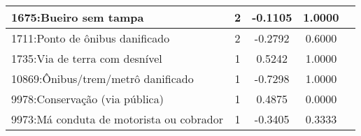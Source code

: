 \begin{table}[htbp]
\begin{tabular}{|l|c|c|c|c|}
		\hline
		1675:Bueiro sem tampa                             & 2                & -0.1105        & 1.0000           \\
		\hline
		1711:Ponto de ônibus danificado                   & 2                & -0.2792        & 0.6000           \\
		\hline
		1735:Via de terra com desnível                    & 1                & 0.5242         & 1.0000           \\
		\hline
		10869:Ônibus/trem/metrô danificado                & 1                & -0.7298        & 1.0000           \\
		\hline
		9978:Conservação (via pública)                    & 1                & 0.4875         & 0.0000           \\
		\hline
		9973:Má conduta de motorista ou cobrador          & 1                & -0.3405        & 0.3333           \\
		\hline
	\end{tabular}
\end{table}

